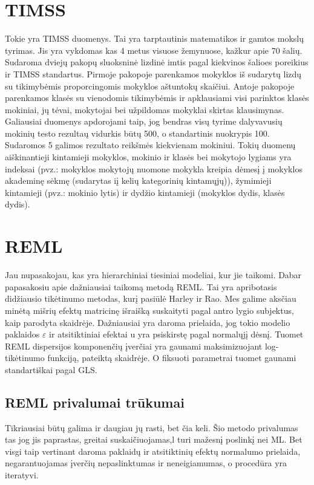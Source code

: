 \documentclass[12pt,a4paper]{article}
\begin{document}
\section*{TIMSS}
Tokie yra TIMSS duomenys. Tai yra tarptautinis matematikos ir gamtos mokslų tyrimas. Jis yra vykdomas kas 4 metus visuose žemynuose, kažkur apie 70 šalių. Sudaroma dviejų pakopų sluoksninė lizdinė imtis pagal kiekvinos šalioes poreikius ir TIMSS standartus. Pirmoje pakopoje parenkamos mokyklos iš sudarytų lizdų su tikimybėmis proporcingomis mokyklos aštuntokų skaičiui. Antoje pakopoje parenkamos klasės su vienodomis tikimybėmis ir apklausiami visi parinktos klasės mokiniai, jų tėvai, mokytojai bei užpildomas mokyklai skirtas klausimynas. Galiausiai duomenys apdorojami taip, jog bendras visų tyrime dalyvavusių mokinių testo rezultaų vidurkis būtų 500, o standartinis nuokrypis 100. Sudaromos 5 galimos rezultato reikšmės kiekvienam mokiniui. Tokių duomenų aiškinantieji kintamieji mokyklos, mokinio ir klasės bei mokytojo lygiams yra indeksai (pvz.: mokyklos mokytojų nuomone mokykla kreipia dėmesį į mokyklos akademinę sėkmę (sudarytas iį kelių kategorinių kintamųjų)), žymimieji kintamieji (pvz.: mokinio lytis) ir dydžio kintamieji (mokyklos dydis, klasės dydis).

\section*{REML}
Jau nupasakojau, kas yra hierarchiniai tiesiniai modeliai, kur jie taikomi. Dabar papasakosiu apie dažniausiai taikomą metodą REML. Tai yra apribotasis didžiausio tikėtinumo metodas, kurį pasiūlė Harley ir Rao. Mes galime aksčiau minėtą mišrių efektų matricinę išraišką suskaityti pagal antro lygio subjektus, kaip parodyta skaidrėje. Dažniausiai yra daroma prielaida, jog tokio modelio paklaidos $\varepsilon$ ir atsitiktiniai efektai u yra psiskirstę pagal normalųjį dėsnį. Tuomet REML dispersijos komponenčių įverčiai yra gaunami maksimizuojant log-tikėtinumo funkciją, pateiktą skaidrėje. O fiksuoti parametrai tuomet gaunami standartiškai pagal GLS.

\subsection*{REML privalumai trūkumai}
Tikriausiai būtų galima ir daugiau jų rasti, bet čia keli. Šio metodo privalumas tas jog jis paprastas, greitai suskaičiuojamas,l turi mažesnį poslinkį nei ML. Bet visgi taip vertinant daroma paklaidų ir atsitiktinių efektų normalumo prielaida, negarantuojamas įverčių nepaslinktumas ir neneigiamumas, o procedūra yra iteratyvi.
\end{document}
